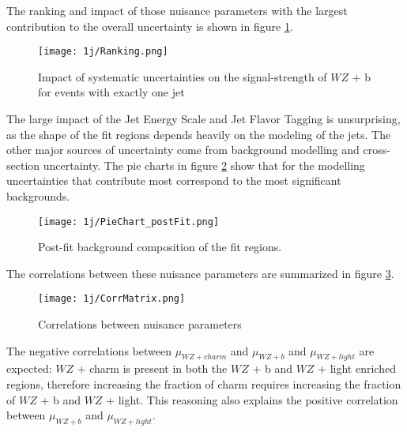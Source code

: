 The ranking and impact of those nuisance parameters with the largest contribution to the overall uncertainty is shown in figure \ref{fig:ranking_1j}.

\begin{figure}[H]
    \centering
    \texttt{[image: 1j/Ranking.png]}
    \caption{Impact of systematic uncertainties on the signal-strength of $WZ$ + b for events with exactly one jet}
    \label{fig:ranking_1j}
\end{figure}

The large impact of the Jet Energy Scale and Jet Flavor Tagging is unsurprising, as the shape of the fit regions depends heavily on the modeling of the jets. The other major sources of uncertainty come from background modelling and cross-section uncertainty. The pie charts in figure \ref{fig:pie_chart_1j} show that for the modelling uncertainties that contribute most correspond to the most significant backgrounds. %

\begin{figure}[H]
    \centering
    \texttt{[image: 1j/PieChart\_postFit.png]}
    \caption{Post-fit background composition of the fit regions.}
    \label{fig:pie_chart_1j}
\end{figure}

The correlations between these nuisance parameters are summarized in figure \ref{fig:corr_mat_1j}. 

\begin{figure}[H]
    \centering
    \texttt{[image: 1j/CorrMatrix.png]}
    \caption{Correlations between nuisance parameters}
    \label{fig:corr_mat_1j}
\end{figure}

The negative correlations between $\mu_{WZ+charm}$ and $\mu_{WZ+b}$ and $\mu_{WZ+light}$ are expected: $WZ$ + charm is present in both the $WZ$ + b and $WZ$ + light enriched regions, therefore increasing the fraction of charm requires increasing the fraction of $WZ$ + b and $WZ$ + light. This reasoning also explains the positive correlation between $\mu_{WZ+b}$ and $\mu_{WZ+light}$. 

